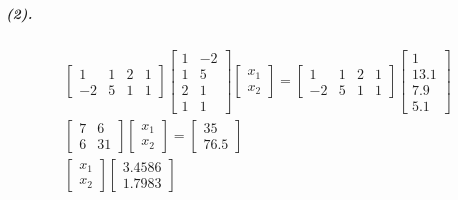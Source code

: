 \documentclass[UTF8]{ctexart}
\begin{document}
	\subparagraph{(2).}
		\begin{displaymath}
		\begin{gathered}
			\begin{bmatrix}
				1 & 1 & 2 & 1\\
				-2 & 5 & 1 & 1
			\end{bmatrix}
			\begin{bmatrix}
				1 & -2\\
				1 & 5\\
				2 & 1\\
				1 & 1
			\end{bmatrix}
			\begin{bmatrix}
				x_1\\x_2
			\end{bmatrix}
			=
			\begin{bmatrix}
				1 & 1 & 2 & 1\\
				-2 & 5 & 1 & 1
			\end{bmatrix}
			\begin{bmatrix}
				1\\13.1\\7.9\\5.1
			\end{bmatrix}
			\\
			\begin{bmatrix}
				7 & 6\\
				6 & 31
			\end{bmatrix}
			\begin{bmatrix}
				x_1\\x_2
			\end{bmatrix}
			=
			\begin{bmatrix}
				35\\76.5
			\end{bmatrix}
			\\
			\begin{bmatrix}
				x_1\\x_2
			\end{bmatrix}
			\begin{bmatrix}
				3.4586\\1.7983
			\end{bmatrix}
		\end{gathered}
		\end{displaymath}
\end{document}
